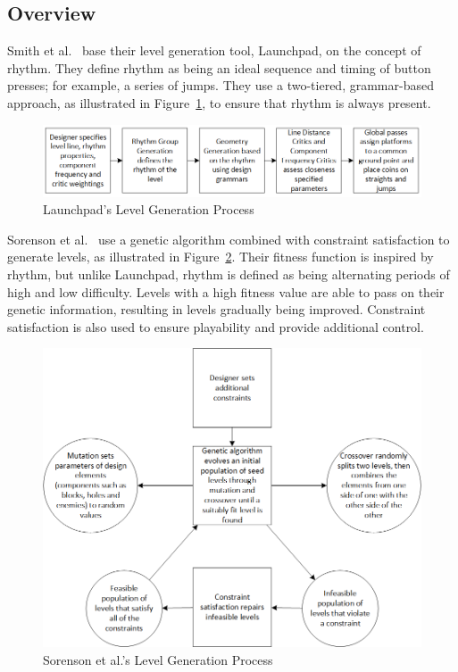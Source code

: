 \documentclass{scrartcl}
\begin{document}
\subsection{Overview}
Smith et al.~\cite{smith:launchpad} base their level generation tool, Launchpad, on the concept of rhythm. They define rhythm as being an ideal sequence and timing of button presses; for example, a series of jumps. They use a two-tiered, grammar-based approach, as illustrated in Figure~\ref{fig:launchpad}, to ensure that rhythm is always present.
\begin{figure}[h]
\includegraphics[width=\textwidth]{figs/launchpad.png}
\caption{Launchpad's Level Generation Process}
\label{fig:launchpad}
\end{figure}

Sorenson et al.~\cite{sorenson:generic} use a genetic algorithm combined with constraint satisfaction to generate levels, as illustrated in Figure~\ref{fig:genetic}. Their fitness function is inspired by rhythm, but unlike Launchpad, rhythm is defined as being alternating periods of high and low difficulty. Levels with a high fitness value are able to pass on their genetic information, resulting in levels gradually being improved. Constraint satisfaction is also used to ensure playability and provide additional control. 
\begin{figure}[h]
\includegraphics[width=\textwidth]{figs/genetic.png}
\caption{Sorenson et al.'s Level Generation Process}
\label{fig:genetic}
\end{figure}
\end{document}
